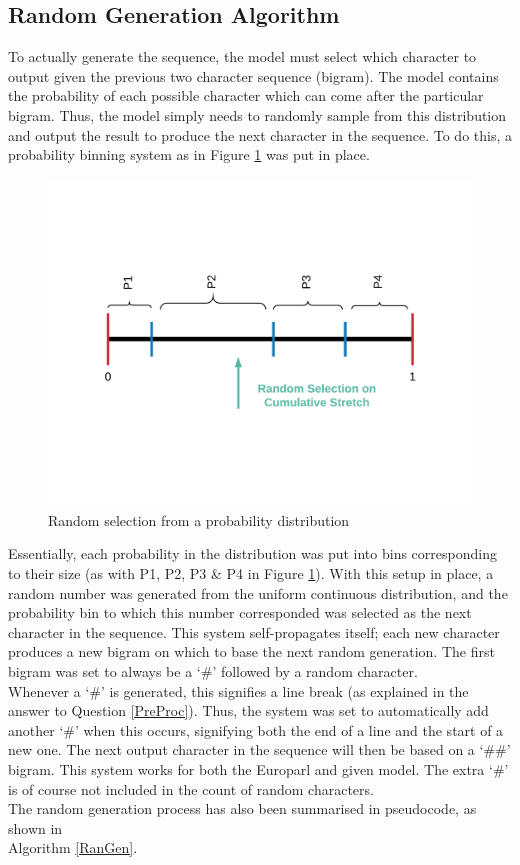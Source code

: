 \documentclass[12pt]{article}
\begin{document}
\subsection{Random Generation Algorithm}
To actually generate the sequence, the model must select which character to output given the previous two character sequence (bigram).  The model contains the probability of each possible character which can come after the particular bigram.  Thus, the model simply needs to randomly sample from this distribution and output the result to produce the next character in the sequence.  To do this, a probability binning system as in Figure \ref{fig:randomgen} was put in place.
\begin{figure}[H]
	\centering
	\includegraphics[width=0.7\linewidth]{graphics/Random_Gen}
	\caption{Random selection from a probability distribution}
	\label{fig:randomgen}
\end{figure}
Essentially, each probability in the distribution was put into bins corresponding to their size (as with P1, P2, P3 \& P4 in Figure \ref{fig:randomgen}).  With this setup in place, a random number was generated from the uniform continuous distribution, and the probability bin to which this number corresponded was selected as the next character in the sequence.  This system self-propagates itself; each new character produces a new bigram on which to base the next random generation.  The first bigram was set to always be a `\#' followed by a random character.\\
\hfill\break
Whenever a `\#' is generated, this signifies a line break (as explained in the answer to Question \ref{PreProc}).  Thus, the system was set to automatically add another `\#' when this occurs, signifying both the end of a line and the start of a new one.  The next output character in the sequence will then be based on a `\#\#' bigram.  This system works for both the Europarl and given model.  The extra `\#' is of course not included in the count of random characters.\\
\hfill\break
The random generation process has also been summarised in pseudocode, as shown in \\Algorithm \ref{RanGen}.
\end{document}
